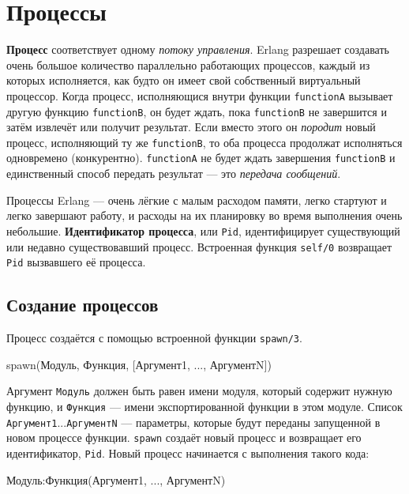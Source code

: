 \chapter{Процессы}
\label{processes}

\textbf{Процесс} соответствует одному \emph{потоку управления}. Erlang разрешает
создавать очень большое количество параллельно работающих процессов, каждый из
которых исполняется, как будто он имеет свой собственный виртуальный процессор.
Когда процесс, исполняющися внутри функции \texttt{functionA} вызывает другую
функцию \texttt{functionB}, он будет ждать, пока \texttt{functionB} не 
завершится и затём извлечёт или получит результат. Если вместо этого он
\emph{породит} новый  процесс, исполняющий ту же \texttt{functionB}, то оба
процесса продолжат исполняться одновремено (конкурентно).  \texttt{functionA}
не будет ждать завершения \texttt{functionB} и единственный способ передать
результат --- это \emph{передача сообщений}.

Процессы Erlang --- очень лёгкие с малым расходом памяти, легко стартуют и легко
завершают работу, и расходы на их планировку во время выполнения очень 
небольшие. \textbf{Идентификатор процесса}, или \texttt{Pid}, идентифицирует
существующий или недавно существовавший процесс. Встроенная функция 
\texttt{self/0} возвращает \texttt{Pid} вызвавшего её процесса.


\section{Создание процессов}

Процесс создаётся с помощью встроенной функции \texttt{spawn/3}.

\begin{erlangru}
spawn(Модуль, Функция, [Аргумент1, ..., АргументN])
\end{erlangru}

Аргумент \texttt{Модуль} должен быть равен имени модуля, который содержит 
нужную функцию, и \texttt{Функция} --- имени экспортированной функции в этом
модуле. Список \texttt{Аргумент1}$...$\texttt{АргументN} --- параметры, которые
будут переданы запущенной в новом процессе функции.  \texttt{spawn} создаёт 
новый процесс и возвращает его идентификатор, \texttt{Pid}. Новый процесс 
начинается с выполнения такого кода:

\begin{erlangru}
Модуль:Функция(Аргумент1, ..., АргументN)
\end{erlangru}


